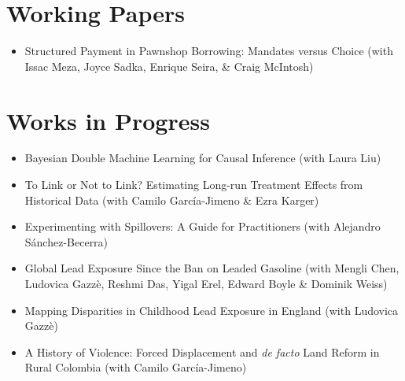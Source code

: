 \documentclass[line,overlapped]{myres}
\begin{document}
\begin{resume}
\section{\sc Working Papers}
\begin{itemize}
  \item Structured Payment in Pawnshop Borrowing: Mandates versus Choice (with Issac Meza, Joyce Sadka, Enrique Seira, \& Craig McIntosh)
\end{itemize}


\section{\sc Works in Progress}
\begin{itemize}
  \item Bayesian Double Machine Learning for Causal Inference (with Laura Liu)
  \item To Link or Not to Link? Estimating Long-run Treatment Effects from Historical Data (with Camilo Garc\'{i}a-Jimeno \& Ezra Karger) 
  \item Experimenting with Spillovers: A Guide for Practitioners (with Alejandro S\'anchez-Becerra)
  \item Global Lead Exposure Since the Ban on Leaded Gasoline (with Mengli Chen, Ludovica Gazz\`e, Reshmi Das, Yigal Erel, Edward Boyle \& Dominik Weiss)
  \item Mapping Disparities in Childhood Lead Exposure in England (with Ludovica Gazz\`e) 
  \item A History of Violence: Forced Displacement and \emph{de facto} Land Reform in Rural Colombia (with Camilo Garc\'{i}a-Jimeno)
\end{itemize}


\end{resume}
\end{document}
